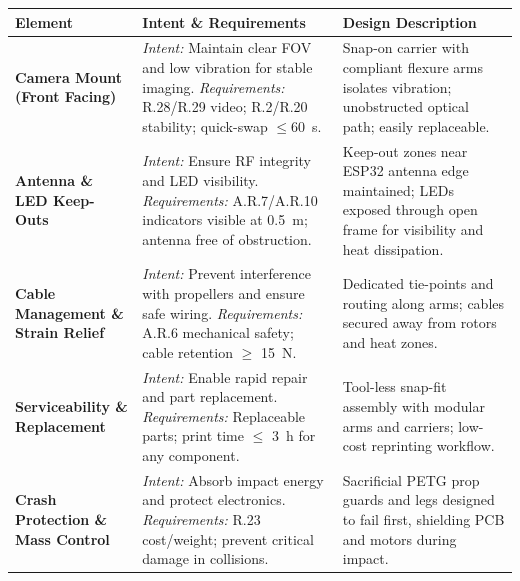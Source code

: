 \begin{longtable}{@{}p{3.2cm} p{6.4cm} p{6.4cm}@{}}
\toprule
\textbf{Element} & \textbf{Intent \& Requirements} & \textbf{Design Description} \\ 
\midrule

\textbf{Camera Mount (Front Facing)} &
\textit{Intent:} Maintain clear FOV and low vibration for stable imaging. \newline
\textit{Requirements:} R.28/R.29 video; R.2/R.20 stability; quick-swap $\leq 60$~s. &
Snap-on carrier with compliant flexure arms isolates vibration; unobstructed optical path; easily replaceable. \\ 
\midrule

\textbf{Antenna \& LED Keep-Outs} &
\textit{Intent:} Ensure RF integrity and LED visibility. \newline
\textit{Requirements:} A.R.7/A.R.10 indicators visible at 0.5~m; antenna free of obstruction. &
Keep-out zones near ESP32 antenna edge maintained; LEDs exposed through open frame for visibility and heat dissipation. \\ 
\midrule

\textbf{Cable Management \& Strain Relief} &
\textit{Intent:} Prevent interference with propellers and ensure safe wiring. \newline
\textit{Requirements:} A.R.6 mechanical safety; cable retention $\geq$ 15~N. &
Dedicated tie-points and routing along arms; cables secured away from rotors and heat zones. \\ 
\midrule

\textbf{Serviceability \& Replacement} &
\textit{Intent:} Enable rapid repair and part replacement. \newline
\textit{Requirements:} Replaceable parts; print time $\leq$ 3~h for any component. &
Tool-less snap-fit assembly with modular arms and carriers; low-cost reprinting workflow. \\ 
\midrule

\textbf{Crash Protection \& Mass Control} &
\textit{Intent:} Absorb impact energy and protect electronics. \newline
\textit{Requirements:} R.23 cost/weight; prevent critical damage in collisions. &
Sacrificial PETG prop guards and legs designed to fail first, shielding PCB and motors during impact. \\ 
\bottomrule
\end{longtable}